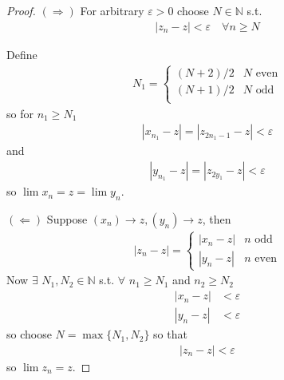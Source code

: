 \begin{proof}
    $(\Rightarrow)$ For arbitrary $\varepsilon > 0$ choose $N \in \mathbb{N}$
    s.t. 
    \begin{align*}
        |z_n - z| < \varepsilon \quad \forall n \geq N
    \end{align*}

    Define 
    \begin{align*}
        N_1 = 
        \begin{cases}
            (N+2)/2 & N \text{ even} \\
            (N+1)/2 & N \text{ odd} \\
        \end{cases}
    \end{align*}
    so for $n_1 \geq N_1$
    \begin{align*}
        |x_{n_1} - z| = |z_{2n_1-1} - z| < \varepsilon
    \end{align*}
    and
    \begin{align*}
        |y_{n_1} - z| = |z_{2y_1} - z| < \varepsilon
    \end{align*}
    so $\lim x_n = z = \lim y_n$.

    $(\Leftarrow)$ Suppose $(x_n) \rightarrow z, (y_n) \rightarrow z$, then
    \begin{align*}
        |z_n - z| = 
        \begin{cases}
            |x_n - z| & n \text{ odd} \\
            |y_n - z| & n \text{ even}
        \end{cases}
    \end{align*}
    Now $\exists$ $N_1, N_2 \in \mathbb{N}$ s.t. $\forall$ $n_1 \geq N_1$
    and $n_2 \geq N_2$
    \begin{align*}
        |x_n-z| &< \varepsilon \\
        |y_n-z| &< \varepsilon
    \end{align*}
    so choose $N = \max \{N_1, N_2\}$ so that 
    \begin{align*}
        |z_n-z| < \varepsilon
    \end{align*}
    so $\lim z_n = z$.
\end{proof}

